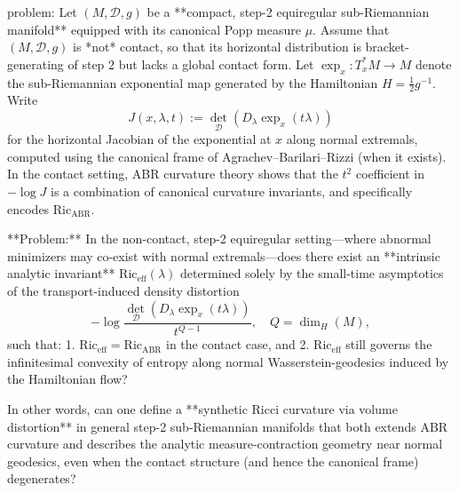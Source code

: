 problem:  
Let \((M,\mathcal{D},g)\) be a **compact, step-2 equiregular sub-Riemannian manifold** equipped with its canonical Popp measure \(\mu\).  Assume that \((M,\mathcal{D},g)\) is *not* contact, so that its horizontal distribution is bracket-generating of step 2 but lacks a global contact form.  Let \(\exp_x:T_x^*M\to M\) denote the sub-Riemannian exponential map generated by the Hamiltonian \(H=\frac12 g^{-1}\).  Write
\[
J(x,\lambda,t) := \det_{\mathcal{D}} ( D_\lambda \exp_x(t\lambda) )
\]
for the horizontal Jacobian of the exponential at \(x\) along normal extremals, computed using the canonical frame of Agrachev–Barilari–Rizzi (when it exists).  In the contact setting, ABR curvature theory shows that the \(t^2\) coefficient in \(-\log J\) is a combination of canonical curvature invariants, and specifically encodes \(\mathrm{Ric}_{\mathrm{ABR}}\).

**Problem:**  
In the non-contact, step-2 equiregular setting—where abnormal minimizers may co-exist with normal extremals—does there exist an **intrinsic analytic invariant** \(\mathrm{Ric}_\mathrm{eff}(\lambda)\) determined solely by the small-time asymptotics of the transport-induced density distortion
\[
-\log \frac{\det_{\mathcal{D}}\!(D_\lambda \exp_x(t\lambda))}{t^{Q-1}}\!,
\quad Q=\dim_H(M),
\]
such that:
1. \(\mathrm{Ric}_\mathrm{eff}=\mathrm{Ric}_{\mathrm{ABR}}\) in the contact case, and  
2. \(\mathrm{Ric}_\mathrm{eff}\) still governs the infinitesimal convexity of entropy along normal Wasserstein-geodesics induced by the Hamiltonian flow?

In other words, can one define a **synthetic Ricci curvature via volume distortion** in general step-2 sub-Riemannian manifolds that both extends ABR curvature and describes the analytic measure-contraction geometry near normal geodesics, even when the contact structure (and hence the canonical frame) degenerates?

